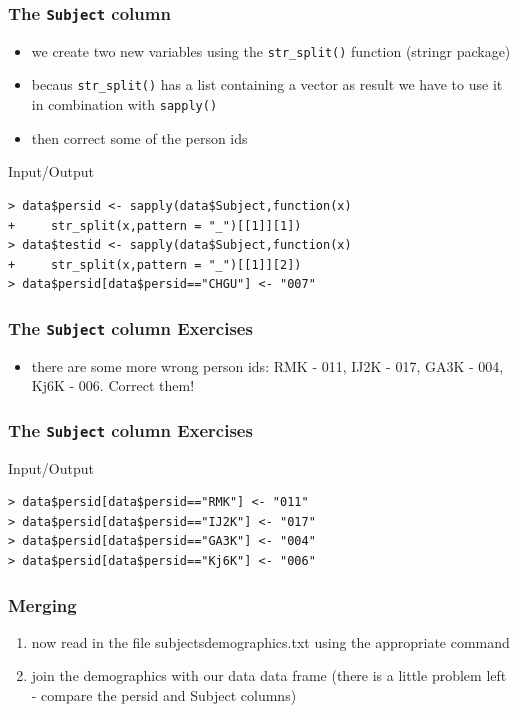 \documentclass[xcolor={table},c]{beamer}
\begin{document}
\begin{frame}[fragile]\frametitle{The \texttt{Subject} column}
  \begin{itemize}
  \item we create two new variables using the \texttt{str\_split()} function (stringr package)
  \item becaus \texttt{str\_split()} has a list containing a vector as result we have to use it in combination with \texttt{sapply()}
  \item then correct some of the person ids
  \end{itemize}
\begin{exampleblock}{Input/Output}\small
\begin{verbatim}
> data$persid <- sapply(data$Subject,function(x)
+     str_split(x,pattern = "_")[[1]][1])
> data$testid <- sapply(data$Subject,function(x)
+     str_split(x,pattern = "_")[[1]][2])
> data$persid[data$persid=="CHGU"] <- "007"
\end{verbatim}
    \end{exampleblock}
\end{frame}


\begin{frame}[fragile]\frametitle{The \texttt{Subject} column Exercises}
  \begin{itemize}
  \item there are some more wrong person ids: RMK - 011, IJ2K - 017, GA3K - 004, Kj6K - 006. Correct them!
  \end{itemize}
\end{frame}

\begin{frame}[fragile]\frametitle{The \texttt{Subject} column Exercises}
\begin{exampleblock}{Input/Output}\small
\begin{verbatim}
> data$persid[data$persid=="RMK"] <- "011"
> data$persid[data$persid=="IJ2K"] <- "017"
> data$persid[data$persid=="GA3K"] <- "004"
> data$persid[data$persid=="Kj6K"] <- "006"
\end{verbatim}
    \end{exampleblock}
\end{frame}


\begin{frame}[fragile]\frametitle{Merging}
  \begin{enumerate}
  \item now read in the file subjectsdemographics.txt using the appropriate command
  \item join the demographics with our data data frame (there is a little problem left - compare the persid and Subject columns)
  \end{enumerate}
\end{frame}
\end{document}
